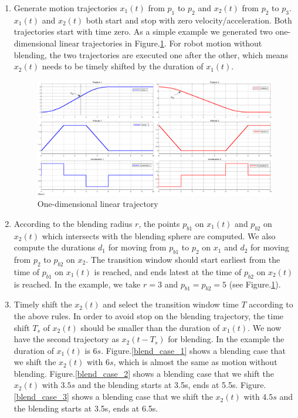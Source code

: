 \documentclass{article}
\begin{document}
\begin{enumerate}
	\item Generate motion trajectories $x_1(t)$ from $p_1$ to $p_2$ and $x_2(t)$ from $p_2$ to $p_3$. $x_1(t)$ and $x_2(t)$ both start and stop with zero velocity/acceleration. Both trajectories start with time zero. As a simple example we generated two one-dimensional linear trajectories in Figure.\ref{ori_traj}. For robot motion without blending, the two trajectories are executed one after the other, which means $x_2(t)$ needs to be timely shifted by the duration of $x_1(t)$.
	\begin{figure}[ht]%
	\includegraphics[width=0.9\columnwidth]{figure/original_trajectories.eps}%
	\caption{One-dimensional linear trajectory}%
	\label{ori_traj}
	\end{figure}

	\item According to the blending radius $r$, the points $p_{b1}$ on $x_1(t)$ and $p_{b2}$ on $x_2(t)$ which intersects with the blending sphere are computed. We also compute the durations $d_1$ for moving from $p_{b1}$ to $p_2$ on $x_1$ and $d_2$ for moving from $p_2$ to $p_{b2}$ on $x_2$. The transition window should start earliest from the time of $p_{b1}$ on $x_1(t)$ is reached, and ends latest at the time of $p_{b2}$ on $x_2(t)$ is reached. In the example, we take $r=3$ and $p_{b1} = p_{b2} = 5$ (see Figure.\ref{ori_traj}).

	\item Timely shift the $x_2(t)$ and select the transition window time $T$ according to the above rules. In order to avoid stop on the blending trajectory, the time shift $T_s$ of $x_2(t)$ should be smaller than the duration of $x_1(t)$. We now have the second trajectory as $x_2(t-T_s)$ for blending. In the example the duration of $x_1(t)$ is $6s$. Figure.\ref{blend_case_1} shows a blending case that we shift the $x_2(t)$ with $6s$, which is almost the same as motion without blending. Figure.\ref{blend_case_2} shows a blending case that we shift the $x_2(t)$ with $3.5s$ and the blending starts at 3.5s, ends at 5.5s. Figure.\ref{blend_case_3} shows a blending case that we shift the $x_2(t)$ with $4.5s$ and the blending starts at 3.5s, ends at 6.5s.
\end{enumerate}
\end{document}
